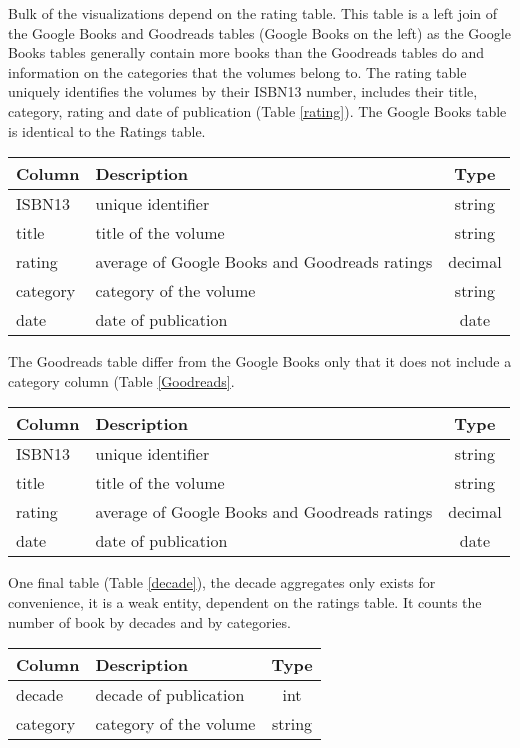 \documentclass[12pt,letterpaper]{article}
\begin{document}
Bulk of the visualizations depend on the rating table. This table is a left join of the Google Books and Goodreads tables (Google Books on the left) as the Google Books tables generally contain more books than the
Goodreads tables do and information on the categories that the volumes belong to. The rating table uniquely identifies the volumes by their ISBN13 number, includes their title, category, rating and date
of publication (Table \ref{rating}). The Google Books table is identical to the Ratings table.

\begin{center}
\begin{tabular}{llc}
 Column & Description & Type \\
 \hline
 ISBN13 & unique identifier  & string \\
 title & title of the volume & string\\
 rating & average of Google Books and Goodreads ratings & decimal \\
 category & category of the volume & string \\
 date & date of publication & date\\
 \hline
\end{tabular}
\end{center}


The Goodreads table differ from the Google Books only that it does not include a category column (Table \ref{Goodreads}.

\begin{center}
\begin{tabular}{llc}
 Column & Description & Type \\
 \hline
 ISBN13 & unique identifier  & string \\
 title & title of the volume & string\\
 rating & average of Google Books and Goodreads ratings & decimal \\
 date & date of publication & date\\
 \hline
\end{tabular}
\end{center}

One final table (Table \ref{decade}), the decade aggregates only exists for convenience, it is a weak entity, dependent on the ratings table. It counts the number of book by decades and by categories.

\begin{center}
\begin{tabular}{llc}
 Column & Description & Type \\
 \hline
 decade & decade of publication  & int \\
 category & category of the volume & string\\
 \hline
\end{tabular}
\end{center}
\end{document}

